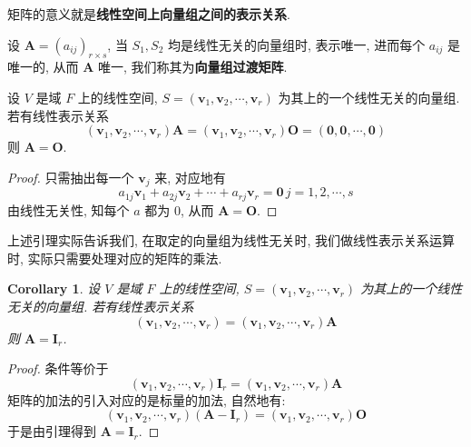 \documentclass[UTF8]{book}
\newtheorem{corollary}{Corollary}[section]
\begin{document}
矩阵的意义就是\textbf{线性空间上向量组之间的表示关系}. 

设 $\boldsymbol{A}=(a_{ij})_{r\times s}$, 
当 $S_1,S_2$ 均是线性无关的向量组时, 表示唯一, 进而每个 $a_{ij}$ 
是唯一的, 从而 $\boldsymbol{A}$ 唯一, 
我们称其为\textbf{向量组过渡矩阵}. 

\begin{lemma}
    设 $V$ 是域 $F$ 上的线性空间, 
    $S = (\boldsymbol{v}_1,\boldsymbol{v}_2,\cdots,\boldsymbol{v}_r)$ 
    为其上的一个线性无关的向量组. 
    若有线性表示关系 
    $$ 
    (\boldsymbol{v}_1,\boldsymbol{v}_2,\cdots,\boldsymbol{v}_r)
    \boldsymbol{A}
    =(\boldsymbol{v}_1,\boldsymbol{v}_2,\cdots,\boldsymbol{v}_r)
    \boldsymbol{O}
    = (\boldsymbol{0},\boldsymbol{0},\cdots,\boldsymbol{0})$$ 
    则 $\boldsymbol{A} = \boldsymbol{O}$. 
\end{lemma}

\begin{proof}
    只需抽出每一个 $\boldsymbol{v}_j$ 来, 对应地有 
    $$  a_{1j}\boldsymbol{v}_1 +a_{2j}\boldsymbol{v}_2
 + \cdots + a_{rj}\boldsymbol{v}_r=\boldsymbol{0}\,j=1,2,\cdots,s $$
    由线性无关性, 知每个 $a$ 都为 0, 从而 
    $\boldsymbol{A} = \boldsymbol{O}$.
\end{proof}

上述引理实际告诉我们, 在取定的向量组为线性无关时, 
我们做线性表示关系运算时, 实际只需要处理对应的矩阵的乘法. 

\begin{corollary} \label{col A=I}
    设 $V$ 是域 $F$ 上的线性空间, 
    $S = (\boldsymbol{v}_1,\boldsymbol{v}_2,\cdots,\boldsymbol{v}_r)$ 
    为其上的一个线性无关的向量组. 
    若有线性表示关系 
    $$ 
    (\boldsymbol{v}_1,\boldsymbol{v}_2,\cdots,\boldsymbol{v}_r)
    = 
    (\boldsymbol{v}_1,\boldsymbol{v}_2,\cdots,\boldsymbol{v}_r)
    \boldsymbol{A}
    $$ 
    则 $\boldsymbol{A} = \boldsymbol{I}_r$. 
\end{corollary}

\begin{proof}
    条件等价于 
    $$ 
    (\boldsymbol{v}_1,\boldsymbol{v}_2,\cdots,\boldsymbol{v}_r)
    \boldsymbol{I}_r= 
    (\boldsymbol{v}_1,\boldsymbol{v}_2,\cdots,\boldsymbol{v}_r)
    \boldsymbol{A}
    $$
    矩阵的加法的引入对应的是标量的加法, 自然地有: 
    $$ 
    (\boldsymbol{v}_1,\boldsymbol{v}_2,\cdots,\boldsymbol{v}_r)
    (\boldsymbol{A}-\boldsymbol{I}_r)= 
    (\boldsymbol{v}_1,\boldsymbol{v}_2,\cdots,\boldsymbol{v}_r)
    \boldsymbol{O}
    $$
    于是由引理得到 $\boldsymbol{A}= \boldsymbol{I}_r$. 
\end{proof}
\end{document}
